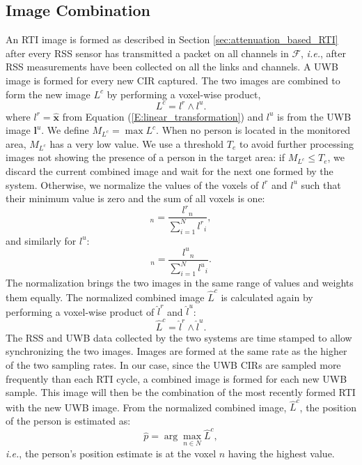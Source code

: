 \documentclass[conference]{IEEEtran}
\begin{document}
\subsection{Image Combination} \label{sec:image_product}

An RTI image is formed as described in Section
\ref{sec:attenuation_based_RTI} after every RSS sensor has transmitted
a packet on all channels in $\mathcal{F}$, \emph{i.e.}, after RSS
measurements have been collected on all the links and channels. A UWB
image is formed for every new CIR captured. The two images are
combined to form the new image $L^c$ by performing a voxel-wise
product,
\begin{equation}
L^c = l^r \wedge l^u.
\end{equation}
where $l^r=\hat{\mathbf{x}}$ from Equation
(\ref{E:linear_transformation}) and $l^u$ is from the UWB image
$\mathbf{l}^u$. We define $M_{L^c} = \max{L^c}$. When no person is
located in the monitored area, $M_{L^c}$ has a very low value. We use
a threshold $T_e$ to avoid further processing images not showing the
presence of a person in the target area: if $M_{L^c} \le T_e$, we
discard the current combined image and wait for the next one formed by
the system. Otherwise, we normalize the values of the voxels of $l^r$
and $l^u$ such that their minimum value is zero and the sum of all
voxels is one:
\begin{equation}
[\hat{l}^r]_{n} = \frac{{{l}^r}_{n}}{\sum_{i=1}^N {{l}^r}_{i}}, 
\end{equation}
and similarly for $l^u$:
\begin{equation}
[\hat{l}^u]_{n} = \frac{{{l}^u}_{n}}{\sum_{i=1}^N {{l}^u}_{i}}.
\end{equation}
The normalization brings the two images in the same range of values
and weights them equally. The normalized combined image $\hat{L}^c$ is
calculated again by performing a voxel-wise product of $\hat{l}^r$ and
$\hat{l}^u$:
\begin{equation}
\hat{L}^c = \hat{l}^r \wedge \hat{l}^u.
\end{equation}
The RSS and UWB data collected by the two systems are time stamped to
allow synchronizing the two images. Images are formed at the same rate
as the higher of the two sampling rates. In our case, since the UWB
CIRs are sampled more frequently than each RTI cycle, a combined image
is formed for each new UWB sample. This image will then be the
combination of the most recently formed RTI with the new UWB
image. From the normalized combined image, $\hat{L}^c$, the position
of the person is estimated as:
\begin{equation} \label{E:person_position}
\hat{p} = \arg\max_{n \in N} \hat{L}^c,
\end{equation}
\emph{i.e.}, the person's position estimate is at the voxel $n$ having the highest value.
\end{document}
